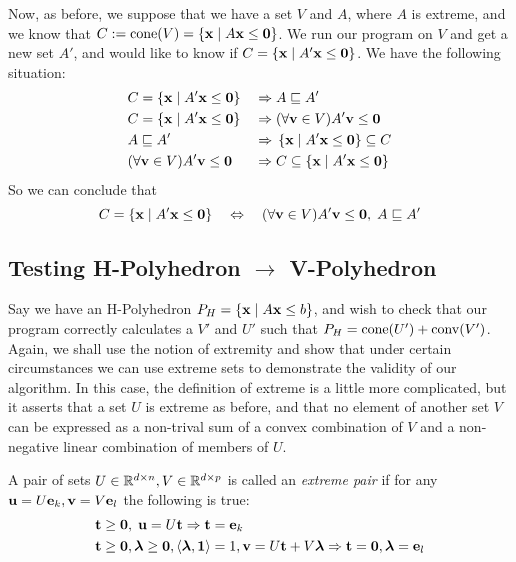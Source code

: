 Now, as before, we suppose that we have a set $V$ and $A$, where $A$ is extreme, and we know that $C := \operatorname{cone}(V) = \left\{\mathbf{x}\;|\; A\mathbf{x}\leq\mathbf{0}\right\}$.  We run our program on $V$ and get a new set $A'$, and would like to know if $C = \left\{\mathbf{x}\;|\; A'\mathbf{x}\leq\mathbf{0}\right\}$.  We have the following situation:
\begin{alignat*}{2}
	 & C = \left\{\mathbf{x}\;|\; A'\mathbf{x}\leq\mathbf{0}\right\}    \;                  & \Rightarrow & \; A \sqsubseteq A'               \\
	 & C = \left\{\mathbf{x}\;|\; A'\mathbf{x}\leq\mathbf{0}\right\}    \;                  & \Rightarrow & \; (\forall \mathbf{v}\in V) A'\mathbf{v} \leq \mathbf{0} \\
	 & A \sqsubseteq A' \;                & \Rightarrow & \; \left\{\mathbf{x}\;|\; A'\mathbf{x}\leq\mathbf{0}\right\} \subseteq C            \\
	 & (\forall \mathbf{v}\in V) A'\mathbf{v} \leq \mathbf{0}  \; & \Rightarrow & \; C \subseteq \left\{\mathbf{x}\;|\; A'\mathbf{x}\leq\mathbf{0}\right\}
\end{alignat*}
So we can conclude that
\[ C = \left\{\mathbf{x}\;|\; A'\mathbf{x}\leq\mathbf{0}\right\} \quad\Leftrightarrow\quad
	(\forall \mathbf{v}\in V)A'\mathbf{v}\leq\mathbf{0},\; A \sqsubseteq A' \]

\subsection{Testing H-Polyhedron $\to$ V-Polyhedron}

Say we have an H-Polyhedron $P_H = \left\{\mathbf{x}\;|\; A\mathbf{x}\leq b\right\}$, and wish to check that our program correctly calculates a $V'$ and $U'$ such that $P_H = \operatorname{cone}(U') + \operatorname{conv}(V')$.  Again, we shall use the notion of extremity and show that under certain circumstances we can use extreme sets to demonstrate the validity of our algorithm.  In this case, the definition of extreme is a little more complicated, but it asserts that a set $U$ is extreme as before, and that no element of another set $V$ can be expressed as a non-trival sum of a convex combination of $V$ and a non-negative linear combination of members of $U$.

\begin{Def}{ A pair of sets $U\in\mathbb{R}^{d\times n}, V\in\mathbb{R}^{d\times p}$ is called an \textit{extreme pair} if for any $\mathbf{u} = U\mathbf{e}_k, \mathbf{v} = V\mathbf{e}_l$ the following is true:
		\begin{alignat*}{1}
			 & \mathbf{t} \geq \mathbf{0},\; \mathbf{u} = U\mathbf{t} \Rightarrow \mathbf{t} = \mathbf{e}_k                     \\
			 & \mathbf{t} \geq \mathbf{0}, \bm{\lambda} \geq \mathbf{0}, \left\langle \bm{\lambda}, \mathbf{1} \right\rangle = 1, \mathbf{v} = U\mathbf{t} + V\bm{\lambda}
			\Rightarrow \mathbf{t} = \mathbf{0}, \bm{\lambda} = \mathbf{e}_l
		\end{alignat*}
	}\end{Def}

